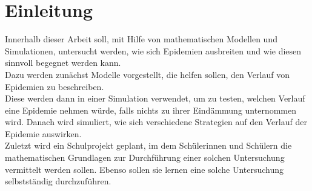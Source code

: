\section{Einleitung}
\ellen
Innerhalb dieser Arbeit soll, mit Hilfe von mathematischen Modellen und Simulationen, untersucht werden, wie sich Epidemien ausbreiten und wie diesen sinnvoll begegnet werden kann.\\
Dazu werden zunächst Modelle vorgestellt, die helfen sollen, den Verlauf von Epidemien zu beschreiben.\\
Diese werden dann in einer Simulation verwendet, um zu testen, welchen Verlauf eine Epidemie nehmen würde, falls nichts zu ihrer Eindämmung unternommen wird. Danach wird simuliert, wie sich verschiedene Strategien auf den Verlauf der Epidemie auswirken.\\
Zuletzt wird ein Schulprojekt geplant, im dem Schülerinnen und Schülern die mathematischen Grundlagen zur Durchführung einer solchen Untersuchung vermittelt werden sollen. Ebenso sollen sie lernen eine solche Untersuchung selbstständig durchzuführen. 